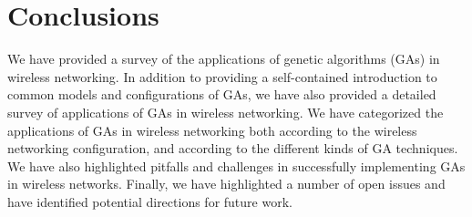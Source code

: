 \documentclass[journal]{IEEEtran}
\begin{document}
\vspace{10pt}
\section{Conclusions}
\label{sec:conclusions}

We have provided a survey of the applications of genetic algorithms (GAs) in wireless networking. In addition to providing a self-contained introduction to common models and configurations of GAs, we have also provided a detailed survey of applications of GAs in wireless networking. We have categorized the applications of GAs in wireless networking both according to the wireless networking configuration, and according to the different kinds of GA techniques. We have also highlighted pitfalls and challenges in successfully implementing GAs in wireless networks. Finally, we have highlighted a number of open issues and have identified potential directions for future work.



\end{document}
